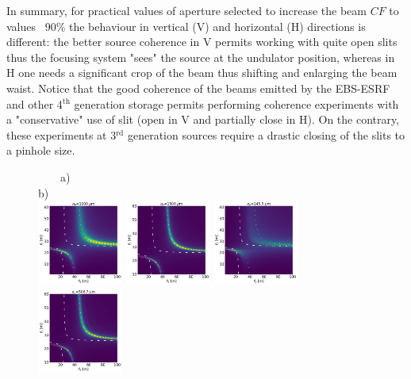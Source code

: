 \documentclass[9pt,twocolumn,twoside]{osajnl}
\begin{document}
In summary, for practical values of aperture selected to increase the beam $CF$ to values ~90\% the behaviour in vertical (V) and horizontal (H) directions is different: the better source coherence in V permits working with quite open slits thus the focusing system "sees" the source at the undulator position, whereas in H one needs a significant crop of the beam thus shifting and enlarging the beam waist. Notice that the good coherence of the beams emitted by the EBS-ESRF and other 4$^{\text{th}}$ generation storage permits performing coherence experiments with a "conservative" use of slit (open in V and partially close in H). On the contrary, these experiments at 3$^{\text{rd}}$ generation sources require a drastic closing of the slits to a pinhole size.      

\begin{figure}[htbp]
~~~~a)~~~~~~~~~~~~~~~~~~~~~~~~~~~~~~~~~~~~~~~~~~~~~~~~~~~~~~b) \\
\hspace{-1.1cm}
\includegraphics[width=0.25\textwidth]{figures/H_3.png}
\includegraphics[width=0.25\textwidth]{figures/V_3.png}
\includegraphics[width=0.25\textwidth]{figures/H_2.png}
\includegraphics[width=0.25\textwidth]{figures/V_2.png}

\end{figure}
\end{document}
